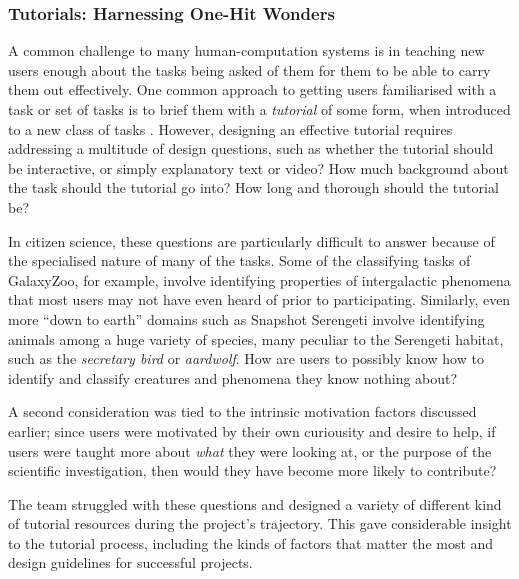 \documentclass{sigchi}
\begin{document}

\subsubsection{Tutorials: Harnessing One-Hit Wonders}
A common challenge to many human-computation systems is in teaching new users  enough about the tasks being asked of them for them to be able to carry them out effectively.   One common approach to getting users familiarised with a task or set of tasks is to brief them with a \emph{tutorial} of some form, when introduced to a new class of tasks \cite{gutheim2012fantasktic}.  However, designing an effective tutorial requires addressing a multitude of design questions, such as whether the tutorial should be interactive, or simply explanatory text or video? How much background about the task should the tutorial go into?   How long and thorough should the tutorial be?

In citizen science, these questions are particularly difficult to answer because of the specialised nature of many of the tasks.  Some of the classifying tasks of GalaxyZoo, for example, involve identifying properties of intergalactic phenomena that most users may not have even heard of prior to participating.  Similarly, even more ``down to earth'' domains such as Snapshot Serengeti involve identifying animals among a huge variety of species, many peculiar to the Serengeti habitat, such as the \emph{secretary bird} or \emph{aardwolf}. How are users to possibly know how to identify and classify creatures and phenomena they know nothing about?

A second consideration was tied to the intrinsic motivation factors discussed earlier; since users were motivated by their own curiousity and desire to help, if users were taught more about \emph{what} they were looking at, or the purpose of the scientific investigation, then would they have become more likely to contribute?

The team struggled with these questions and designed a variety of different kind of tutorial resources during the project's trajectory.  This gave considerable insight to the tutorial process, including the kinds of factors that matter the most and design guidelines for successful projects.
\end{document}
